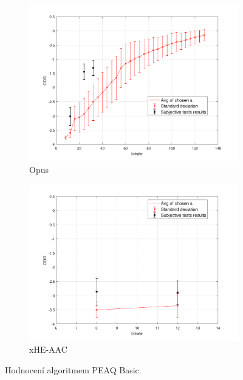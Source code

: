 \begin{figure}[htb]
\begin{subfigure}{.5\textwidth}
        \centering
        \includegraphics[width=1\linewidth]{pic/objective/opusBasic.pdf}
        \caption{Opus}
        \label{app:bas:sub5}
    \end{subfigure}%
        \begin{subfigure}{.5\textwidth}
        \centering
        \includegraphics[width=1\linewidth]{pic/objective/xheBasic.pdf}
        \caption{xHE-AAC}
        \label{app:bas:sub6}
    \end{subfigure}%
    \caption{Hodnocení algoritmem PEAQ Basic.} 
\label{app:Basic}
\end{figure}



